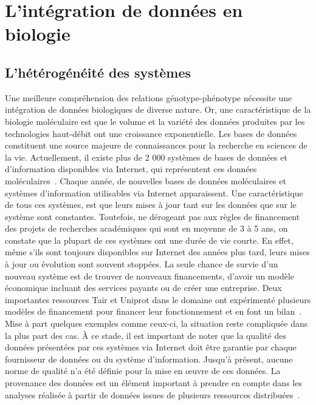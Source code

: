 \section{L'intégration de données en biologie}
\subsection{L'hétérogénéité des systèmes}
Une meilleure compréhension des relations génotype-phénotype nécessite une intégration de données biologiques de diverse nature. Or, une caractéristique de la biologie moléculaire est que le volume et la variété des données produites par les technologies haut-débit ont une croissance exponentielle. Les bases de données constituent une source majeure de connaissances pour la recherche en sciences de la vie. Actuellement, il existe plus de 2 000 systèmes de bases de données et d'information disponibles via Internet, qui représentent ces données moléculaires~\cite{NAR2019}. Chaque année, de nouvelles bases de données moléculaires et systèmes d’information utilisables via Internet apparaissent. Une caractéristique de tous ces systèmes, est que leurs mises à jour tant sur les données que sur le système sont constantes. Toutefois, ne dérogeant pas aux règles de financement des projets de recherches académiques qui sont en moyenne de 3 à 5 ans, on constate que la plupart de ces systèmes ont une durée de vie courte. En effet, même s'ils sont toujours disponibles sur Internet des années plus tard, leurs mises à jour ou évolution sont souvent stoppées. La seule chance de survie d’un nouveau système est de trouver de nouveaux financements, d'avoir un modèle économique incluant des services payants ou de créer une entreprise. Deux importantes ressources Tair et Uniprot dans le domaine ont expérimenté plusieurs modèles de financement pour financer leur fonctionnement et en font un bilan~\cite{TAIR_sustainable_2016,Uniprot_funding_2017}. Mise à part quelques exemples comme ceux-ci, la situation reste compliquée dans la plus part des cas.  À ce stade, il est important de noter que la qualité des données présentées par ces systèmes via Internet doit être garantie par chaque fournisseur de données ou du système d’information. Jusqu'à présent, aucune norme de qualité n'a été définie pour la mise en \oe uvre de ces données. La provenance des données est un élément important à prendre en compte dans les analyses réalisée à partir de données issues de plusieurs ressources distribuées~\cite{ICDE2011}.\\

